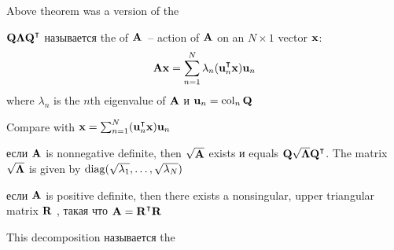 \begin{frame}

   \vspace{2em}

    Above theorem was a version of the 

    $\boldQ \boldLambda \boldQ^\T$ называется the  of $\mathbf A$\ -- action of $\mathbf A$ on an
    $N \times 1$ vector ${\mathbf x}$:
    \begin{equation*}
        \boldA\boldx = \sum_{n=1}^N \lambda_n (\boldu_n^\T \boldx) \boldu_n
    \end{equation*}
    where $\lambda_n$ is the $n$th eigenvalue of $\mathbf A$ и ${\mathbf u}_n = \operatorname{col}_n \mathbf Q$
    
    \vspace{.7em}
    Compare with $\boldx = \sum_{n=1}^N (\boldu_n^\T \boldx) \boldu_n$
    
\end{frame}

\begin{frame}

    \vspace{2em}
    \Fact{\eqref{ET-fa:sqrtsnd}}
    если $\mathbf A$ is nonnegative definite, then $\sqrt{\mathbf A}$
    exists и equals $\boldQ \sqrt{\boldLambda} \boldQ^\T$.
    The matrix $\sqrt{{\boldsymbol \Lambda}}$ is given by $\operatorname{diag}(\sqrt{\lambda_1},
    \ldots, \sqrt{\lambda_N})$
    
    \vspace{.7em}
    \Fact{\eqref{ET-fa:cholesky}}
    если $\mathbf A$ is positive definite, then there exists a nonsingular, upper
    triangular matrix $\mathbf R$ , такая что $\boldA = \boldR^\T \boldR$
    
    This decomposition называется the 

\end{frame}

